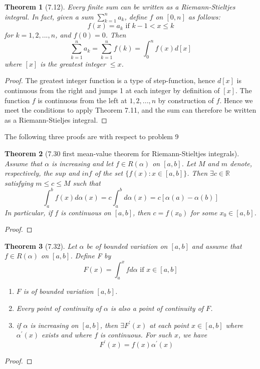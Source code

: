\documentclass[aps,pra,notitlepage,amsmath,amssymb,letterpaper,12pt]{revtex4-1}
\newtheorem{theorem}{Theorem}
\begin{document}
\begin{theorem}[7.12]
Every finite sum can be written as a Riemann-Stieltjes integral. In fact, given a sum $\sum_{k=1}^{n} a_{k}$, define $f$ on $[0,n]$ as follows:
\[f(x) = a_{k}  \textrm{  if  }  k-1 < x \leq k\]
for $k=1,2,...,n$, and $f(0) = 0$. Then
\[\sum_{k=1}^{n}a_{k} = \sum_{k=1}^{n}f(k) = \int_{0}^{n}f(x)d[x]\]
where $[x]$ is the greatest integer $\leq x$.
\end{theorem}
\begin{proof}
The greatest integer function is a type of step-function, hence $d[x]$ is continuous from the right and jumps 1 at each integer by definition of $[x]$. The function $f$ is continuous from the left at $1,2,...,n$ by construction of $f$. Hence we meet the conditions to apply Theorem 7.11, and the sum can therefore be written as a Riemann-Stieljes integral.
\end{proof}

The following three proofs are with respect to problem 9
\begin{theorem}[7.30 first mean-value theorem for Riemann-Stieltjes integrals]
Assume that $\alpha$ is increasing and let $f \in R(\alpha)$ on $[a,b]$. Let $M$ and $m$ denote, respectively, the $sup$ and $inf$ of the set $\{f(x):x \in [a,b]\}$. Then $\exists c \in \mathbb{R}$ satisfying $m \leq c \leq M$ such that
\[\int_{a}^{b}f(x)d\alpha(x) = c\int_{a}^{b}d\alpha(x) = c[\alpha(a)-\alpha(b)]\]
In particular, if $f$ is continuous on $[a,b]$, then $c=f(x_{0})$ for some $x_{0} \in [a,b]$.
\end{theorem}
\begin{proof}
\end{proof}

\begin{theorem}[7.32]
Let $\alpha$ be of bounded variation on $[a,b]$ and assume that
$f \in R(\alpha)$ on $[a,b]$. Define F by
\[F(x)=\int_{a}^{x} f d \alpha \textrm{ if } x \in [a,b]\]
\begin{enumerate}[\upshape a)]
  \item $F$ is of bounded variation $[a,b]$.
  \item Every point of continuity of $\alpha$ is also a point of continuity of $F$.
  \item if $\alpha$ is increasing on $[a,b]$, then $\exists F^\prime(x)$ at each point $x \in [a,b]$ where $\alpha^\prime(x)$ exists and where $f$ is continuous. For such $x$, we have $$F^\prime(x) = f(x)\alpha^\prime(x)$$
\end{enumerate}
\end{theorem}
\begin{proof}
\end{proof}
\end{document}
